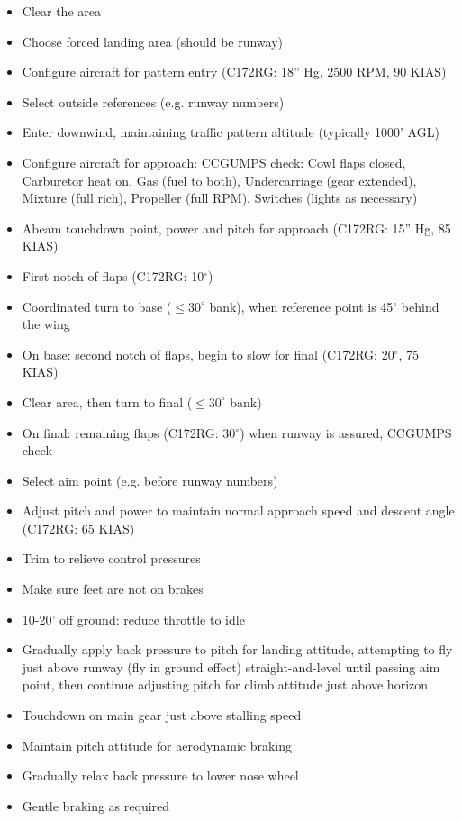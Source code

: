 \begin{itemize}
  \item Clear the area
  \item Choose forced landing area (should be runway)
  \item Configure aircraft for pattern entry (C172RG: 18'' Hg, 2500 RPM, 90
    KIAS) 
  \item Select outside references (e.g. runway numbers)
  \item Enter downwind, maintaining traffic pattern altitude (typically 1000'
    AGL) 
  \item Configure aircraft for approach: CCGUMPS check: Cowl flaps closed,
    Carburetor heat on, Gas (fuel to both), Undercarriage (gear extended),
    Mixture (full rich), Propeller (full RPM), Switches (lights as necessary)
  \item Abeam touchdown point, power and pitch for approach (C172RG: 15'' Hg, 85
    KIAS)
  \item First notch of flaps (C172RG: 10$^\circ$)
  \item Coordinated turn to base ($\leq 30^\circ$ bank), when reference point
    is 45$^\circ$ behind the wing
  \item On base: second notch of flaps, begin to slow for final (C172RG:
    20$^\circ$, 75 KIAS)
  \item Clear area, then turn to final ($\leq 30^\circ$ bank)
  \item On final: remaining flaps (C172RG: 30$^\circ$) when runway is assured,
    CCGUMPS check
  \item Select aim point (e.g. before runway numbers)
  \item Adjust pitch and power to maintain normal approach speed and descent
    angle (C172RG: 65 KIAS)
  \item Trim to relieve control pressures
  \item Make sure feet are not on brakes
  \item 10-20' off ground: reduce throttle to idle
  \item Gradually apply back pressure to pitch for landing attitude, attempting
    to fly just above runway (fly in ground effect) straight-and-level until
    passing aim point, then continue adjusting pitch for climb attitude just
    above horizon
  \item Touchdown on main gear just above stalling speed
  \item Maintain pitch attitude for aerodynamic braking
  \item Gradually relax back pressure to lower nose wheel
  \item Gentle braking as required
\end{itemize}

